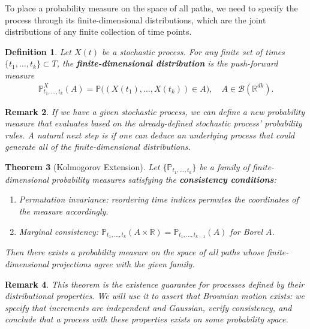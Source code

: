 \documentclass{report}
\theoremstyle{spacedplain}
\newtheorem{theorem}{Theorem}[section]
\theoremstyle{spaceddefinition}
\newtheorem{definition}[theorem]{Definition}
\theoremstyle{spacedremark}
\newtheorem{remark}[theorem]{Remark}
\begin{document}
To place a probability measure on the space of all paths, we need to specify the process through its finite-dimensional distributions, which are the joint distributions of any finite collection of time points.

\begin{definition}
Let $X(t)$ be a stochastic process. For any finite set of times $\{t_1, \ldots, t_k\} \subset T$, the \textbf{finite-dimensional distribution} is the push-forward measure
\begin{align}
    \mathbb{P}^X_{t_1,\ldots,t_k}(A) = \mathbb{P}\bigl((X(t_1), \ldots, X(t_k)) \in A\bigr), \quad A \in \mathcal{B}(\mathbb{R}^{dk}).
\end{align}
\end{definition}

\begin{remark}
    If we have a given stochastic process, we can define a new probability measure that evaluates based on the already-defined stochastic process' probability rules. A natural next step is if one can deduce an underlying process that could generate all of the finite-dimensional distributions.
\end{remark}

\begin{theorem}[Kolmogorov Extension]
Let $\{\mathbb{P}_{t_1,\ldots,t_k}\}$ be a family of finite-dimensional probability measures satisfying the \textbf{consistency conditions}:
\begin{enumerate}
    \item \emph{Permutation invariance:} reordering time indices permutes the coordinates of the measure accordingly.
    \item \emph{Marginal consistency:} $\mathbb{P}_{t_1,\ldots,t_k}(A \times \mathbb{R}) = \mathbb{P}_{t_1,\ldots,t_{k-1}}(A)$ for Borel $A$.
\end{enumerate}
Then there exists a probability measure on the space of all paths whose finite-dimensional projections agree with the given family.
\end{theorem}

\begin{remark}
This theorem is the existence guarantee for processes defined by their distributional properties. We will use it to assert that Brownian motion exists: we specify that increments are independent and Gaussian, verify consistency, and conclude that a process with these properties exists on some probability space.
\end{remark}
\end{document}
